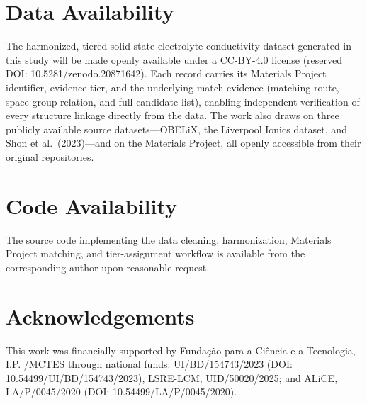 \documentclass[a4paper,fleqn]{cas-sc}
\begin{document}


\printcredits

\section*{Data Availability}
The harmonized, tiered solid-state electrolyte conductivity dataset generated in this study will be made openly available under a CC-BY-4.0 license (reserved DOI: 10.5281/zenodo.20871642). Each record carries its Materials Project identifier, evidence tier, and the underlying match evidence (matching route, space-group relation, and full candidate list), enabling independent verification of every structure linkage directly from the data. The work also draws on three publicly available source datasets---OBELiX, the Liverpool Ionics dataset, and Shon et al.\ (2023)---and on the Materials Project, all openly accessible from their original repositories.

\section*{Code Availability}
The source code implementing the data cleaning, harmonization, Materials Project matching, and tier-assignment workflow is available from the corresponding author upon reasonable request.

\section*{Acknowledgements}
This work was financially supported by Fundação para a Ciência e a Tecnologia, I.P. /MCTES through national funds: UI/BD/154743/2023 (DOI: 10.54499/UI/BD/154743/2023), LSRE-LCM, UID/50020/2025; and ALiCE, LA/P/0045/2020 (DOI: 10.54499/LA/P/0045/2020).

%



\end{document}
